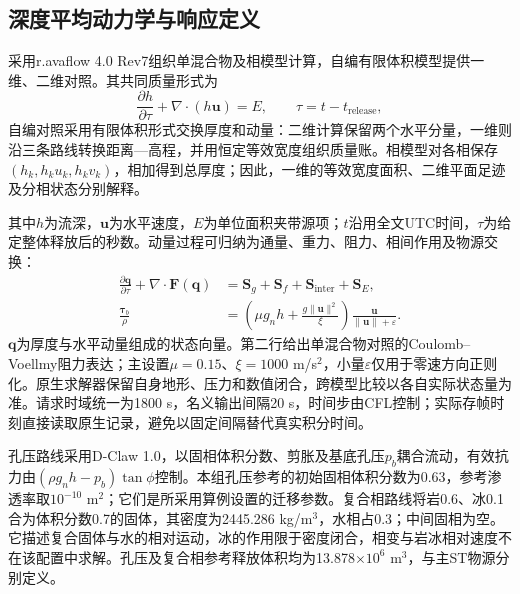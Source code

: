 \subsection{深度平均动力学与响应定义}

采用r.avaflow 4.0 Rev7组织单混合物及相模型计算\cite{q4-ravaflow,q4-multiphase}，自编有限体积模型提供一维、二维对照。其共同质量形式为
\begin{equation}
\frac{\partial h}{\partial\tau}+\nabla\!\cdot(h\boldsymbol u)=E,
\qquad \tau=t-t_{\mathrm{release}},
\label{q4-eq-mass}
\end{equation}
自编对照采用有限体积形式交换厚度和动量：二维计算保留两个水平分量，一维则沿三条路线转换距离—高程，并用恒定等效宽度组织质量账。相模型对各相保存$(h_k,h_ku_k,h_kv_k)$，相加得到总厚度；因此，一维的等效宽度面积、二维平面足迹及分相状态分别解释。

其中$h$为流深，$\boldsymbol u$为水平速度，$E$为单位面积夹带源项；$t$沿用全文UTC时间，$\tau$为给定整体释放后的秒数。动量过程可归纳为通量、重力、阻力、相间作用及物源交换：
\begin{equation}
\begin{aligned}
\frac{\partial\boldsymbol q}{\partial\tau}+\nabla\!\cdot\boldsymbol F(\boldsymbol q)
&=\boldsymbol S_g+\boldsymbol S_f+\boldsymbol S_{\mathrm{inter}}+\boldsymbol S_E,\\
\frac{\boldsymbol\tau_b}{\rho}
&=\left(\mu g_nh+\frac{g\lVert\boldsymbol u\rVert^2}{\xi}\right)
\frac{\boldsymbol u}{\lVert\boldsymbol u\rVert+\varepsilon}.
\end{aligned}
\label{q4-eq-momentum}
\end{equation}
$\boldsymbol q$为厚度与水平动量组成的状态向量。第二行给出单混合物对照的Coulomb--Voellmy阻力表达；主设置$\mu=0.15$、$\xi=1000$ m/s$^2$，小量$\varepsilon$仅用于零速方向正则化。原生求解器保留自身地形、压力和数值闭合，跨模型比较以各自实际状态量为准。请求时域统一为1800 s，名义输出间隔20 s，时间步由CFL控制；实际存帧时刻直接读取原生记录，避免以固定间隔替代真实积分时间。

孔压路线采用D-Claw 1.0\cite{q4-dclaw,q4-dclaw-code}，以固相体积分数、剪胀及基底孔压$p_b$耦合流动，有效抗力由$(\rho g_nh-p_b)\tan\phi$控制。本组孔压参考的初始固相体积分数为0.63，参考渗透率取$10^{-10}$ m$^2$；它们是所采用算例设置的迁移参数。复合相路线将岩0.6、冰0.1合为体积分数0.7的固体，其密度为2445.286 kg/m$^3$，水相占0.3；中间固相为空。它描述复合固体与水的相对运动，冰的作用限于密度闭合，相变与岩冰相对速度不在该配置中求解。孔压及复合相参考释放体积均为13.878$\times10^6$ m$^3$，与主ST物源分别定义。

